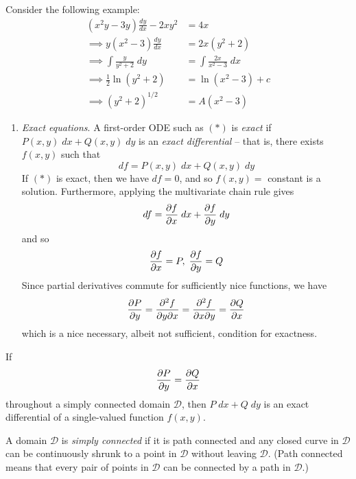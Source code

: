 \documentclass{../../template/note}
\begin{document}
    \begin{example}
        Consider the following example:
        \begin{align*}
            (x^2y-3y)\frac{dy}{dx} - 2xy^2 &= 4x \\
            \implies y(x^2-3)\frac{dy}{dx} &= 2x(y^2+2) \\
            \implies \int \frac{y}{y^2+2} \; dy &= \int \frac{2x}{x^2-3} \; dx \\
            \implies \frac{1}{2} \ln(y^2+2) &= \ln(x^2-3) + c \\
            \implies \left(y^2+2\right)^{1/2} &= A(x^2-3)
        \end{align*}
    \end{example}
    
    \begin{enumerate}[resume]
        \item \emph{Exact equations}. A first-order ODE such as \((*)\) is \emph{exact} if \(P(x,y) \; dx + Q(x, y) \; dy\) is an \emph{exact differential} -- that is, there exists \(f(x, y)\) such that 
        \[
            df = P(x, y) \; dx + Q(x, y) \; dy
        \]
        If \((*)\) is exact, then we have \(df = 0\), and so \(f(x, y) =\) constant is a solution. Furthermore, applying the multivariate chain rule gives
        \[
            df = \pd{f}{x} \; dx + \pd{f}{y} \; dy
        \]
        and so
        \begin{align*}
            \pd{f}{x} = P,\; \pd{f}{y} = Q
        \end{align*}
        Since partial derivatives commute for sufficiently nice functions, we have
        \begin{align*}
            \pd{P}{y} = \pd{^2f}{y \partial x} = \pd{^2f}{x \partial y} = \pd{Q}{x}
        \end{align*}
        which is a nice necessary, albeit not sufficient, condition for exactness.
    \end{enumerate}
    
    \begin{theorem}
        If
        \begin{align*}
            \pd{P}{y} = \pd{Q}{x}
        \end{align*}
        throughout a simply connected domain \(\mathcal D\), then \(P \; dx + Q \; dy\) is an exact differential of a single-valued function \(f(x, y)\).
    \end{theorem}
    
    \begin{definition}
        A domain \(\mathcal D\) is \emph{simply connected} if it is path connected and any closed curve in \(\mathcal D\) can be continuously shrunk to a point in \(\mathcal D\) without leaving \(\mathcal D\). (Path connected means that every pair of points in \(\mathcal D\) can be connected by a path in \(\mathcal D\).)
    \end{definition}
    
\end{document}
